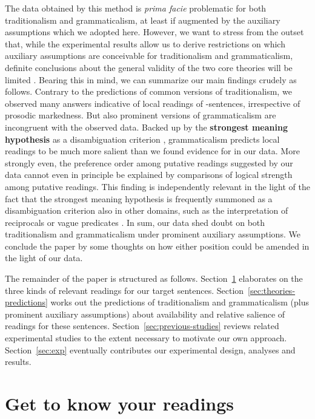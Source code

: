 \documentclass[fleqn,reqno,10pt]{article}
\renewcommand{\es}{\acro{es}}
\renewcommand{\mymark}[1]{\textbf{#1}}
\begin{document}
The data obtained by this method is \emph{prima facie} problematic for
both traditionalism and grammaticalism, at least if augmented by the
auxiliary assumptions which we adopted here. However, we want to
stress from the outset that, while the experimental results allow us
to derive restrictions on which auxiliary assumptions are conceivable
for traditionalism and grammaticalism, definite conclusions about the
general validity of the two core theories will be limited
\citep[cf.][]{ChemlaSingh2014:Remarks-on-the-}. Bearing this in mind,
we can summarize our main findings crudely as follows. Contrary to the
predictions of common versions of traditionalism, we observed many
answers indicative of local readings of \es-sentences, irrespective of
prosodic markedness. But also prominent versions of grammaticalism are
incongruent with the observed data.  Backed up by the
\mymark{strongest meaning hypothesis}
\citep{DalrympleKanazawa1998:Reciprocal-Expr} as a disambiguation
criterion \citep[as suggested by][]{ChierchiaFox2008:The-Grammatical},
grammaticalism predicts local readings to be much more salient than we
found evidence for in our data. More strongly even, the preference
order among putative readings suggested by our data cannot even in
principle be explained by comparisons of logical strength among
putative readings. This finding is independently relevant in the light
of the fact that the strongest meaning hypothesis is frequently
summoned as a disambiguation criterion also in other domains, such as
the interpretation of reciprocals
\citep{DalrympleKanazawa1998:Reciprocal-Expr} or vague predicates
\citep{CobrerosEgre2012:Tolerant-Classi}. In sum, our data shed doubt
on both traditionalism and grammaticalism under prominent auxiliary
assumptions. We conclude the paper by some thoughts on how either
position could be amended in the light of our data.


The remainder of the paper is structured as
follows. Section~\ref{sec:get-know-your} elaborates on the three kinds
of relevant readings for our target
sentences. Section~\ref{sec:theories-predictions} works out the
predictions of traditionalism and grammaticalism (plus prominent auxiliary assumptions) 
about availability and relative salience of readings for these
sentences. Section~\ref{sec:previous-studies} reviews related
experimental studies to the extent necessary to motivate our own
approach. Section~\ref{sec:exp} eventually contributes our
experimental design, analyses and results.

\section{Get to know your readings}
\label{sec:get-know-your}
\end{document}
